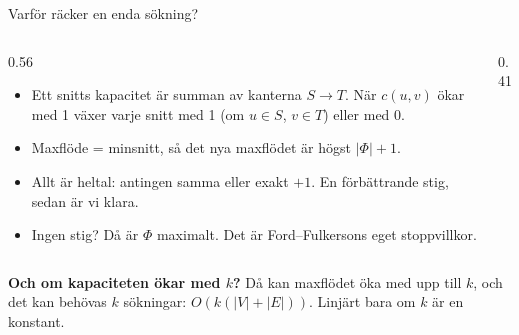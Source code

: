{\kaninbg
\begin{frame}{\kh Varför räcker en enda sökning?}
\begin{columns}[T]
\begin{column}{0.56\textwidth}
\small
\begin{itemize}\setlength{\itemsep}{3pt}
  \item Ett snitts kapacitet är summan av kanterna $S\to T$. När $c(u,v)$ ökar med 1 växer
        varje snitt med 1 (om $u\in S$, $v\in T$) eller med 0.
  \item Maxflöde = minsnitt, så det nya maxflödet är högst $|\Phi|+1$.
  \item Allt är heltal: antingen samma eller exakt $+1$. En förbättrande stig, sedan är vi klara.
  \item Ingen stig? Då är $\Phi$ maximalt. Det är Ford--Fulkersons eget stoppvillkor.
\end{itemize}
\end{column}
\begin{column}{0.41\textwidth}
\centering

\end{column}
\end{columns}
\vfill
\begin{kaninbox}[fontupper=\footnotesize]
\textbf{Och om kapaciteten ökar med $k$?} Då kan maxflödet öka med upp till $k$, och det kan behövas
$k$ sökningar: $O(k(|V|+|E|))$. Linjärt bara om $k$ är en konstant.
\end{kaninbox}
\end{frame}}

